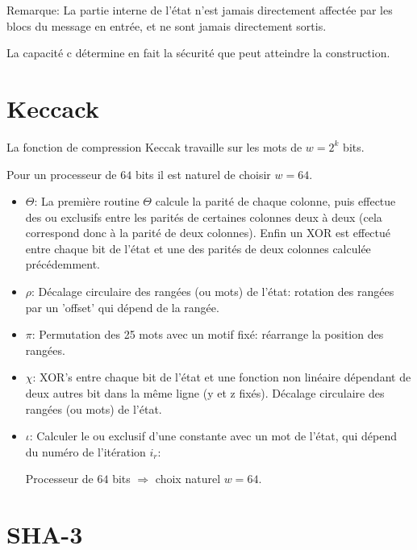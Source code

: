 \documentclass[10.5pt, a4paper, twoside, openright]{report}
\begin{document}
Remarque: La partie interne de l'état n'est jamais directement affectée par les blocs du message en entrée, et ne sont jamais directement sortis.

La capacité c détermine en fait la sécurité que peut atteindre la construction. 


\section{Keccack}
La fonction de compression Keccak travaille sur les mots de $w=2^k$ bits.

Pour un processeur de $64$ bits il est naturel de choisir $w=64$.
\begin{itemize}
\item{$\Theta$:
La première routine $\Theta$ calcule la parité de chaque colonne, puis effectue des ou exclusifs entre les parités de certaines colonnes deux à deux (cela correspond donc à la parité de deux colonnes).
Enfin un XOR est effectué entre chaque bit de l'état et une des parités de deux colonnes calculée précédemment. 
}

\item{$\rho$: 
Décalage circulaire des rangées (ou mots) de l'état: rotation des rangées par un 'offset' qui dépend de la rangée.}
\item{$\pi$: 
Permutation des 25 mots avec un motif fixé: réarrange la position des rangées.}
\item{$\chi$: 
XOR's entre chaque bit de l'état et une fonction non linéaire dépendant de deux autres bit dans la même ligne (y et z fixés).
Décalage circulaire des rangées (ou mots) de l'état.}
\item{$\iota$:
Calculer le ou exclusif d’une constante avec un mot de l’état, qui dépend du numéro de l’itération $i_r$:}


  Processeur de $64$ bits $\Rightarrow$ choix naturel $w=64$.
\end{itemize}
\section{SHA-3}
\end{document}
